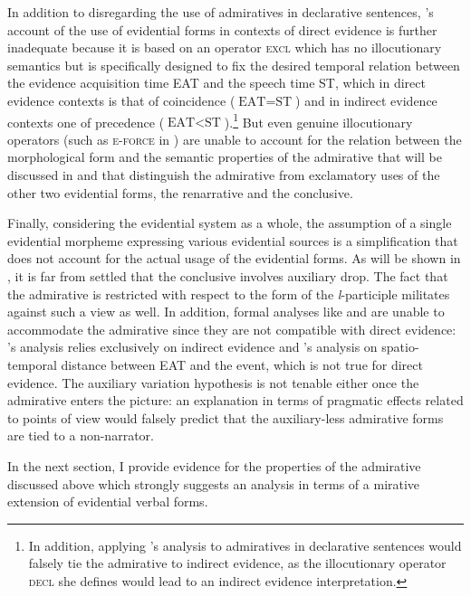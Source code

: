 \documentclass[output=paper]{langscibook}
\begin{document}
In addition to disregarding the use of admiratives in declarative sentences, \citeauthor{Smirnova2013}'s account of the use of evidential forms in contexts of direct evidence is further inadequate because it is based on an operator \textsc{excl} which has no illocutionary semantics but is specifically designed to fix the desired temporal relation between the evidence acquisition time EAT and the speech time ST, which in direct evidence contexts is that of coincidence ($\text{EAT}=\text{ST}$) and in indirect evidence contexts one of precedence ($\text{EAT}<\text{ST}$).\footnote{In addition, applying \citeauthor{Smirnova2013}'s analysis to admiratives in declarative sentences would falsely tie the admirative to indirect evidence, as the illocutionary operator \textsc{decl} she defines would lead to an indirect evidence interpretation.} But even genuine illocutionary operators (such as \textsc{e-force} in \citealt[429]{Rett2011}) are unable to account for the relation between the morphological form and the semantic properties of the admirative that will be discussed in  and that distinguish the admirative from exclamatory uses of the other two evidential forms, the renarrative and the conclusive.

Finally, considering the  evidential system as a whole, the assumption of a single evidential morpheme expressing various evidential sources is a simplification that does not account for the actual usage of the  evidential forms. As will be shown in , it is far from settled that the conclusive involves auxiliary drop. The fact that the admirative is restricted with respect to the form of the \textit{l}-participle militates against such a view as well. In addition, formal analyses like \citet{Izvorski1997} and \citet{Koev2017} are unable to accommodate the admirative since they are not compatible with direct evidence: \citeauthor{Izvorski1997}'s analysis relies exclusively on indirect evidence and \citeauthor{Koev2017}'s analysis on spatio-temporal distance between EAT and the event, which is not true for direct evidence. The auxiliary variation hypothesis is not tenable either once the admirative enters the picture: an explanation in terms of pragmatic effects related to points of view would falsely predict that the auxiliary-less admirative forms are tied to a non-narrator.\largerpage

In the next section, I provide evidence for the properties of the  admirative discussed above which strongly suggests an analysis in terms of a mirative extension of evidential verbal forms.
\end{document}
